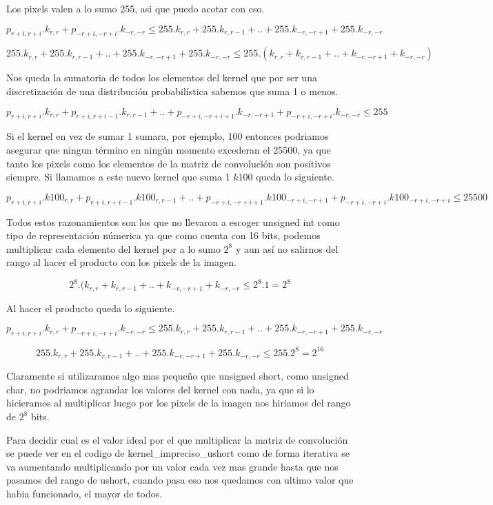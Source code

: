 Los pixels valen a lo sumo 255, asi que puedo acotar con eso.

$$ p_{r+i,r+i}.k_{r,r} + p_{-r+i,-r+i}.k_{-r,-r} \leq 255.k_{r,r} + 255.k_{r,r-1} + .. + 255.k_{-r,-r+1} + 255.k_{-r,-r} $$

$$ 255.k_{r,r} + 255.k_{r,r-1} + .. + 255.k_{-r,-r+1} + 255.k_{-r,-r} \leq 255.(k_{r,r} + k_{r,r-1} + .. + k_{-r,-r+1} + k_{-r,-r}) $$

Nos queda la sumatoria de todos los elementos del kernel que por ser una discretización de una distribución probabilística sabemos que suma 1 o menos.

$$ p_{r+i,r+i}.k_{r,r} + p_{r+i,r+i-1}.k_{r,r-1} + .. +  p_{-r+i,-r+i+1}.k_{-r,-r+1} + p_{-r+i,-r+i}.k_{-r,-r} \leq 255 $$

Si el kernel en vez de sumar 1 sumara, por ejemplo, 100 entonces podriamos asegurar que ningun término en ningún momento excederan el 25500, ya que tanto los pixels como los elementos de la matriz de convolución son positivos siempre. Si llamamos a este nuevo kernel que suma 1 $k100$ queda lo siguiente.

$$ p_{r+i,r+i}.k100_{r,r} + p_{r+i,r+i-1}.k100_{r,r-1} + .. +  p_{-r+i,-r+i+1}.k100_{-r+i,-r+1} + p_{-r+i,-r+i}.k100_{-r+i,-r+i} \leq 25500 $$

Todos estos razonamientos son los que no llevaron a escoger unsigned int como tipo de representación númerica ya que como cuenta con 16 bits, podemos multiplicar cada elemento del kernel por a lo sumo $2^8$ y aun así no salirnos del rango al hacer el producto con los pixels de la imagen.

$$ 2^{8}.(k_{r,r} + k_{r,r-1} + .. + k_{-r,-r+1} + k_{-r,-r} \leq 2^{8}.1 = 2^{8} $$

Al hacer el producto queda lo siguiente.

$$ p_{r+i,r+i}.k_{r,r} + p_{-r+i,-r+i}.k_{-r,-r} \leq 255.k_{r,r} + 255.k_{r,r-1} + .. + 255.k_{-r,-r+1} + 255.k_{-r,-r} $$

$$ 255.k_{r,r} + 255.k_{r,r-1} + .. + 255.k_{-r,-r+1} + 255.k_{-r,-r} \leq 255.2^{8} = 2^{16} $$

Claramente si utilizaramos algo mas pequeño que unsigned short, como unsigned char, no podriamos agrandar los valores del kernel con nada, ya que si lo hicieramos al multiplicar luego por los pixels de la imagen nos hiriamos del rango de $2^{8}$ bits.

Para decidir cual es el valor ideal por el que multiplicar la matriz de convolución se puede ver en el codigo de kernel\_impreciso\_ushort como de forma iterativa se va aumentando multiplicando por un valor cada vez mas grande hasta que nos pasamos del rango de ushort, cuando pasa eso nos quedamos con ultimo valor que habia funcionado, el mayor de todos.
 
